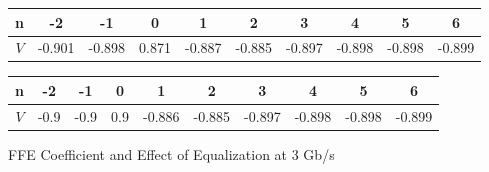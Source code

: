 \documentclass{book}  %
\begin{document}
\begin{paper}
\begin{figure}
	\begin{minipage}[tb]{\textwidth}
		\centering	
		\begin{tabular}{|c|c|c|c|c|c|c|c|c|c|}\hline
			n  &   -2   &   -1   &   0   &    1   &    2   &    3   &    4   &    5   &    6   \\ \hline 
			$V$ & -0.901 & -0.898 & 0.871 & -0.887 & -0.885 & -0.897 & -0.898 & -0.898 & -0.899 \\ \hline
		\end{tabular} 
		\label{table:3G_rxdiff_sample_wo_FFE}
	\end{minipage}	
	\begin{minipage}[tb]{\textwidth}
		\centering	
		\begin{tabular}{|c|c|c|c|c|c|c|c|c|c|}\hline
			n  &  -2  &  -1  &  0  &    1   &    2   &    3   &    4   &    5   &    6   \\ \hline 
			$V$ & -0.9 & -0.9 & 0.9 & -0.886 & -0.885 & -0.897 & -0.898 & -0.898 & -0.899 \\ \hline
		\end{tabular}
		\label{table:3G_rxdiff_sample_w__FFE} 
	\end{minipage}
	\caption{FFE Coefficient and Effect of Equalization at 3 Gb/s}
\end{figure}


\end{paper}
\end{document}
